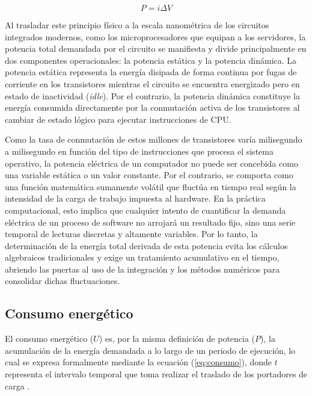 \documentclass[12pt, letter paper]{report}
\begin{document}
        \begin{equation}
          P = i \Delta V
          \label{eq:potenciaElectrica}
        \end{equation}

        Al trasladar este principio físico a la escala nanométrica de los
        circuitos integrados modernos, como los microprocesadores que equipan a
        los servidores, la potencia total demandada por el circuito se
        manifiesta y divide principalmente en dos componentes operacionales: la
        potencia estática y la potencia dinámica. La potencia estática
        representa la energía disipada de forma continua por fugas de corriente
        en los transistores mientras el circuito se encuentra energizado pero en
        estado de inactividad (\textit{idle}). Por el contrario, la potencia
        dinámica constituye la energía consumida directamente por la conmutación
        activa de los transistores al cambiar de estado lógico para ejecutar
        instrucciones de CPU.

        Como la tasa de conmutación de estos millones de transistores varía
        milisegundo a milisegundo en función del tipo de instrucciones que
        procesa el sistema operativo, la potencia eléctrica de un computador no
        puede ser concebida como una variable estática o un valor constante. Por
        el contrario, se comporta como una función matemática sumamente volátil
        que fluctúa en tiempo real según la intensidad de la carga de trabajo
        impuesta al hardware. En la práctica computacional, esto implica que
        cualquier intento de cuantificar la demanda eléctrica de un proceso de
        software no arrojará un resultado fijo, sino una serie temporal de
        lecturas discretas y altamente variables. Por lo tanto, la determinación
        de la energía total derivada de esta potencia evita los cálculos
        algebraicos tradicionales y exige un tratamiento acumulativo en el
        tiempo, abriendo las puertas al uso de la integración y los métodos 
        numéricos para consolidar dichas fluctuaciones.

      \subsection{Consumo energético} %
      \label{sub:consumo_energetico_teorico}
        El consumo energético ($U$) es, por la misma definición de potencia
        ($P$), la acumulación de la energía demandada a lo largo de un periodo
        de ejecución, lo cual se expresa formalmente mediante la ecuación
        (\ref{eq:consumo}), donde $t$ representa el intervalo temporal que toma
        realizar el traslado de los portadores de carga \cite{sears2004fisica}.
\end{document}
